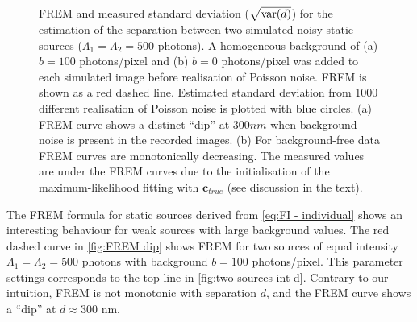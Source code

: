 %
\clearpage
\begin{figure}[!bh]
	\centering
	\newcommand{\wf}{.45\textwidth}
	\caption{FREM and measured standard deviation ($\sqrt{\mathrm{var}(d)}$) for the estimation of the separation between two simulated noisy static sources ($\Lambda_1=\Lambda_2=500$ photons). A homogeneous background of (a) $b=100$ photons/pixel and (b) $b=0$ photons/pixel was added to each simulated image before realisation of Poisson noise.  FREM is shown as a red dashed line. Estimated standard deviation from 1000 different realisation of Poisson noise is plotted with blue circles. (a) FREM curve shows a distinct ``dip'' at $300 \unit{nm}$ when background noise is present in the recorded images. (b) For background-free data FREM curves are monotonically decreasing. The measured values are under the FREM curves due to the initialisation of the maximum-likelihood fitting with $\bm{c}_{true}$ (see discussion in the text).}
	\label{fig:FREM dip both}
\end{figure}
%
The FREM formula for static sources derived from \autoref{eq:FI - individual} shows an interesting behaviour for weak sources with large background values. The red dashed curve in \autoref{fig:FREM dip} shows FREM for two sources of equal intensity $\Lambda_1=\Lambda_2=500$ photons with background $b=100$ photons/pixel. This parameter settings corresponds to the top line in \autoref{fig:two sources int d}. Contrary to our intuition, FREM is not monotonic with separation $d$, and the FREM curve shows a ``dip'' at $d\approx300$ nm.


